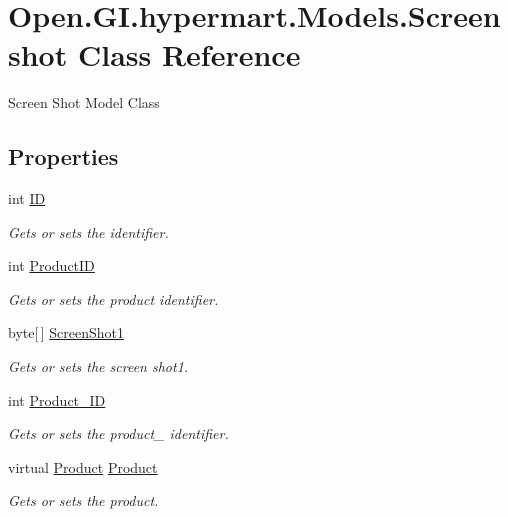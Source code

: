 \hypertarget{class_open_1_1_g_i_1_1hypermart_1_1_models_1_1_screenshot}{}\section{Open.\+G\+I.\+hypermart.\+Models.\+Screenshot Class Reference}
\label{class_open_1_1_g_i_1_1hypermart_1_1_models_1_1_screenshot}


Screen Shot Model Class  


\subsection*{Properties}
\begin{DoxyCompactItemize}
\item 
int \hyperlink{class_open_1_1_g_i_1_1hypermart_1_1_models_1_1_screenshot_a7460fabffe75a362966595c8b86cdef2}{I\+D}
\begin{DoxyCompactList}\small\item\em Gets or sets the identifier. \end{DoxyCompactList}\item 
int \hyperlink{class_open_1_1_g_i_1_1hypermart_1_1_models_1_1_screenshot_ad381abf51bb0ebb1c2566c70df11c05a}{Product\+I\+D}
\begin{DoxyCompactList}\small\item\em Gets or sets the product identifier. \end{DoxyCompactList}\item 
byte\mbox{[}$\,$\mbox{]} \hyperlink{class_open_1_1_g_i_1_1hypermart_1_1_models_1_1_screenshot_a435ca1863d66de2de497d603585610d8}{Screen\+Shot1}
\begin{DoxyCompactList}\small\item\em Gets or sets the screen shot1. \end{DoxyCompactList}\item 
int \hyperlink{class_open_1_1_g_i_1_1hypermart_1_1_models_1_1_screenshot_ad4a216c738b5d98ddc006359ebdfe304}{Product\+\_\+\+I\+D}
\begin{DoxyCompactList}\small\item\em Gets or sets the product\+\_\+ identifier. \end{DoxyCompactList}\item 
virtual \hyperlink{class_open_1_1_g_i_1_1hypermart_1_1_models_1_1_product}{Product} \hyperlink{class_open_1_1_g_i_1_1hypermart_1_1_models_1_1_screenshot_ae2ce2f5bb22f6d3e20186701015aa355}{Product}
\begin{DoxyCompactList}\small\item\em Gets or sets the product. \end{DoxyCompactList}\end{DoxyCompactItemize}


